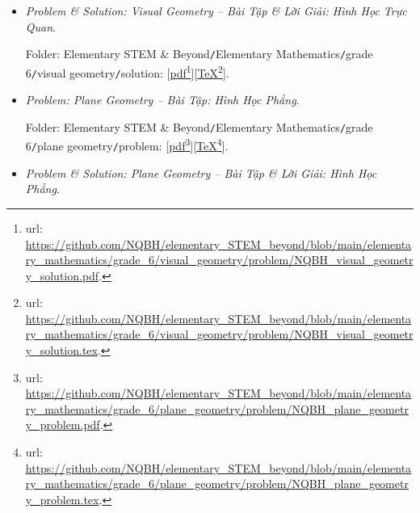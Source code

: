 \documentclass[12pt]{article}
\begin{document}
\begin{itemize}
	Folder: {\sf Elementary STEM \& Beyond{\tt/}Elementary Mathematics{\tt/}grade 6{\tt/}visual geometry{\tt/}problem}: [\href{https://github.com/NQBH/elementary_STEM_beyond/blob/main/elementary_mathematics/grade_6/visual_geometry/problem/NQBH_visual_geometry_problem.pdf}{pdf}\footnote{{\sc url}: \url{https://github.com/NQBH/elementary_STEM_beyond/blob/main/elementary_mathematics/grade_6/visual_geometry/problem/NQBH_visual_geometry_problem.pdf}.}][\href{https://github.com/NQBH/elementary_STEM_beyond/blob/main/elementary_mathematics/grade_6/visual_geometry/problem/NQBH_visual_geometry_problem.tex}{\TeX}\footnote{{\sc url}: \url{https://github.com/NQBH/elementary_STEM_beyond/blob/main/elementary_mathematics/grade_6/visual_geometry/problem/NQBH_visual_geometry_problem.tex}.}].
	\item {\it Problem \& Solution: Visual Geometry -- Bài Tập \& Lời Giải: Hình Học Trực Quan}.
	
	Folder: {\sf Elementary STEM \& Beyond{\tt/}Elementary Mathematics{\tt/}grade 6{\tt/}visual geometry{\tt/}solution}: [\href{https://github.com/NQBH/elementary_STEM_beyond/blob/main/elementary_mathematics/grade_6/visual_geometry/problem/NQBH_visual_geometry_solution.pdf}{pdf}\footnote{{\sc url}: \url{https://github.com/NQBH/elementary_STEM_beyond/blob/main/elementary_mathematics/grade_6/visual_geometry/problem/NQBH_visual_geometry_solution.pdf}.}][\href{https://github.com/NQBH/elementary_STEM_beyond/blob/main/elementary_mathematics/grade_6/visual_geometry/problem/NQBH_visual_geometry_solution.tex}{\TeX}\footnote{{\sc url}: \url{https://github.com/NQBH/elementary_STEM_beyond/blob/main/elementary_mathematics/grade_6/visual_geometry/problem/NQBH_visual_geometry_solution.tex}.}].
	\item {\it Problem: Plane Geometry -- Bài Tập: Hình Học Phẳng}.
	
	Folder: {\sf Elementary STEM \& Beyond{\tt/}Elementary Mathematics{\tt/}grade 6{\tt/}plane geometry{\tt/}problem}: [\href{https://github.com/NQBH/elementary_STEM_beyond/blob/main/elementary_mathematics/grade_6/plane_geometry/problem/NQBH_plane_geometry_problem.pdf}{pdf}\footnote{{\sc url}: \url{https://github.com/NQBH/elementary_STEM_beyond/blob/main/elementary_mathematics/grade_6/plane_geometry/problem/NQBH_plane_geometry_problem.pdf}.}][\href{https://github.com/NQBH/elementary_STEM_beyond/blob/main/elementary_mathematics/grade_6/plane_geometry/problem/NQBH_plane_geometry_problem.tex}{\TeX}\footnote{{\sc url}: \url{https://github.com/NQBH/elementary_STEM_beyond/blob/main/elementary_mathematics/grade_6/plane_geometry/problem/NQBH_plane_geometry_problem.tex}.}].
	\item {\it Problem \& Solution: Plane Geometry -- Bài Tập \& Lời Giải: Hình Học Phẳng}.
	

\end{itemize}
\end{document}
